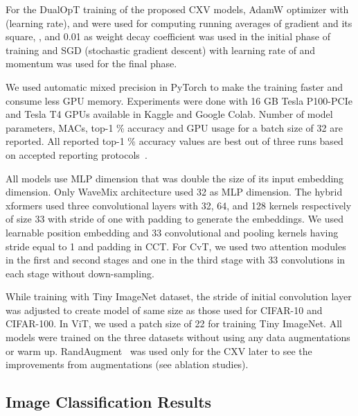 \documentclass{article}
\begin{document}
For the DualOpT training of the proposed CXV models, AdamW optimizer with  (learning rate),  and  were used for computing running averages of gradient and its square, , and 0.01 as weight decay coefficient was used in the initial phase of training and SGD (stochastic gradient descent) with learning rate of  and momentum  was used for the final phase. 

We used automatic mixed precision in PyTorch to make the training faster and consume less GPU memory. Experiments were done with 16 GB Tesla P100-PCIe and Tesla T4 GPUs available in Kaggle and Google Colab. Number of model parameters,  MACs, top-1 \% accuracy and GPU usage for a batch size of 32 are reported. All reported top-1 \% accuracy values are best out of three runs based on accepted reporting protocols~\cite{hassani2021escaping}. 

All models use MLP dimension that was double the size of its input embedding dimension. Only WaveMix architecture used 32 as MLP dimension. The hybrid xformers used three convolutional layers with 32, 64, and 128 kernels respectively of size 33 with stride of one with padding to generate the embeddings. We used learnable position embedding and 33 convolutional and pooling kernels having stride equal to 1 and padding in CCT. For CvT, we used two attention modules in the first and second stages and one in the third stage with 33 convolutions in each stage without down-sampling.

While training with Tiny ImageNet dataset, the stride of initial convolution layer was adjusted to create model of same size as those used for CIFAR-10 and CIFAR-100. In ViT, we used a patch size of 22 for training Tiny ImageNet. All models were trained on the three datasets without using any data augmentations or warm up. RandAugment~\cite{cubuk2019randaugment} was used only for the CXV later to see the improvements from augmentations (see ablation studies). 


\subsection{Image Classification Results}

\label{subsec:img}
\end{document}
